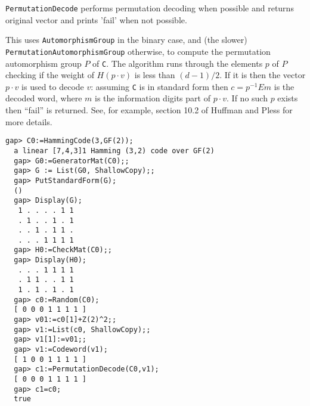 \documentclass[11pt]{report}
\begin{document}
{{{ \texttt{PermutationDecode} performs permutation decoding when possible and returns original vector and
prints 'fail' when not possible. 

 This uses \texttt{AutomorphismGroup} in the binary case, and (the slower) \texttt{PermutationAutomorphismGroup} otherwise, to compute the permutation automorphism group $P$ of \mbox{\texttt{C}}. The algorithm runs through the elements $p$ of $P$ checking if the weight of $H(p\cdot v)$ is less than $(d-1)/2$. If it is then the vector $p\cdot v$ is used to decode $v$: assuming \mbox{\texttt{C}} is in standard form then $c=p^{-1}Em$ is the decoded word, where $m$ is the information digits part of $p\cdot v$. If no such $p$ exists then ``fail'' is returned. See, for example, section 10.2 of Huffman
and Pless \cite{HP03} for more details. }

 
\begin{Verbatim}[fontsize=\small,frame=single,label=Example]
  gap> C0:=HammingCode(3,GF(2));
  a linear [7,4,3]1 Hamming (3,2) code over GF(2)
  gap> G0:=GeneratorMat(C0);;
  gap> G := List(G0, ShallowCopy);;
  gap> PutStandardForm(G);
  ()
  gap> Display(G);
   1 . . . . 1 1
   . 1 . . 1 . 1
   . . 1 . 1 1 .
   . . . 1 1 1 1
  gap> H0:=CheckMat(C0);;
  gap> Display(H0);
   . . . 1 1 1 1
   . 1 1 . . 1 1
   1 . 1 . 1 . 1
  gap> c0:=Random(C0);
  [ 0 0 0 1 1 1 1 ]
  gap> v01:=c0[1]+Z(2)^2;;
  gap> v1:=List(c0, ShallowCopy);;
  gap> v1[1]:=v01;;
  gap> v1:=Codeword(v1);
  [ 1 0 0 1 1 1 1 ]
  gap> c1:=PermutationDecode(C0,v1);
  [ 0 0 0 1 1 1 1 ]
  gap> c1=c0;
  true
\end{Verbatim}
  }

 }

 
\end{document}
